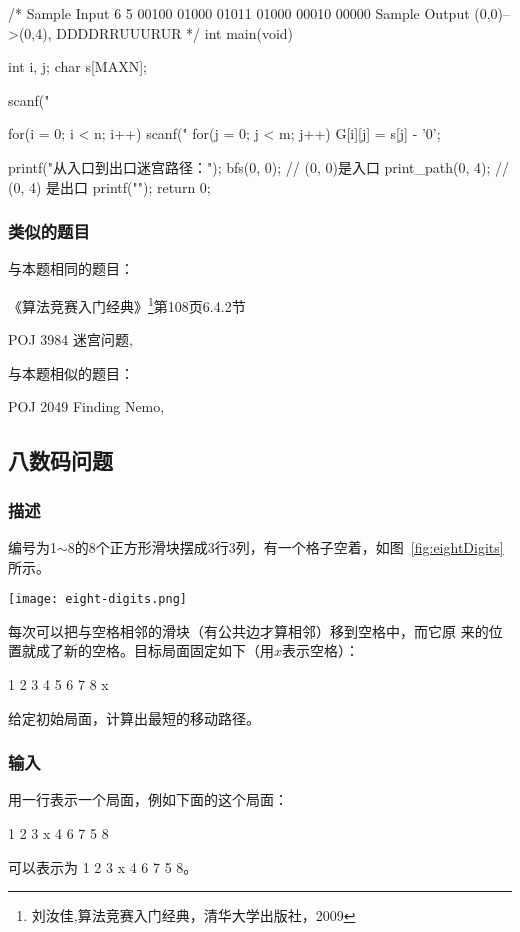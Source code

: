 \begin{Codex}[label=maze.c]
/*
Sample Input
6 5
00100
01000
01011
01000
00010
00000
Sample Output
(0,0)-->(0,4), DDDDRRUUURUR
*/
int main(void) {
    int i, j;
    char s[MAXN];

    scanf("%

    for(i = 0; i < n; i++) {
        scanf("%
        for(j = 0; j < m; j++) {
            G[i][j] = s[j] - '0';
        }
    }

    printf("从入口到出口迷宫路径：\n");
    bfs(0, 0);	// (0, 0)是入口
    print_path(0, 4); // (0, 4) 是出口
    printf("\n");
    return 0;
}
\end{Codex}

\subsubsection{类似的题目}
与本题相同的题目：
\begindot
\item 《算法竞赛入门经典》\footnote{刘汝佳,算法竞赛入门经典，清华大学出版社，2009}第108页6.4.2节
\item  POJ 3984 迷宫问题, 
\myenddot

与本题相似的题目：
\begindot
\item  POJ 2049 Finding Nemo, 
\myenddot

\subsection{八数码问题}
\label{subsec:eightDigits}

\subsubsection{描述}
编号为1$\sim$8的8个正方形滑块摆成3行3列，有一个格子空着，如图~\ref{fig:eightDigits}所示。

\begin{center}
\texttt{[image: eight-digits.png]}\\
\label{fig:eightDigits}
\end{center}

每次可以把与空格相邻的滑块（有公共边才算相邻）移到空格中，而它原
来的位置就成了新的空格。目标局面固定如下（用$x$表示空格）：
\begin{Code}
1 2 3
4 5 6
7 8 x
\end{Code}

给定初始局面，计算出最短的移动路径。

\subsubsection{输入}
用一行表示一个局面，例如下面的这个局面：
\begin{Code}
 1  2  3
 x  4  6
 7  5  8
\end{Code}
可以表示为 1 2 3 x 4 6 7 5 8。 

